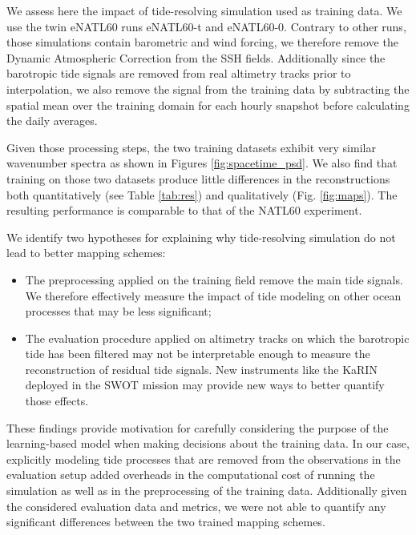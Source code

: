 \begin{bibunit}
We assess here the impact of tide-resolving simulation used as training data. We use the twin eNATL60 runs eNATL60-t and eNATL60-0. Contrary to other runs, those simulations contain barometric and wind forcing, we therefore remove the Dynamic Atmospheric Correction \cite{carrereMajorImprovementAltimetry2016} from the SSH fields. Additionally since the barotropic tide signals are removed from real altimetry tracks prior to interpolation, we also remove the signal from the training data by subtracting the spatial mean over the training domain for each hourly snapshot before calculating the daily averages.  

Given those processing steps, the two training datasets  exhibit very similar wavenumber spectra as shown in Figures \ref{fig:spacetime_psd}. 
We also find that training on those two datasets produce little differences in the reconstructions both quantitatively  (see Table \ref{tab:res}) and qualitatively (Fig. \ref{fig:maps}). The resulting performance is comparable to that of the NATL60 experiment.
 
We identify two hypotheses for explaining why tide-resolving simulation do not lead to better mapping schemes:
\begin{itemize}
    \item The preprocessing applied on the training field remove the main tide signals. We therefore effectively measure the impact of tide modeling on other ocean processes that may be less significant;
    \item The evaluation procedure applied on altimetry tracks on which the barotropic tide has been filtered may not be interpretable enough to measure the reconstruction of residual tide signals. New instruments like the KaRIN deployed in the SWOT mission may provide new ways to better quantify those effects.   
\end{itemize}

These findings provide motivation for carefully considering the purpose of the learning-based model when making decisions about the training data. In our case, explicitly modeling tide processes that are removed from the observations in the evaluation setup added overheads in the computational cost of running the simulation as well as in the preprocessing of the training data. Additionally given the considered evaluation data and metrics, we were not able to quantify any significant differences between the two trained mapping schemes.



\end{bibunit}
